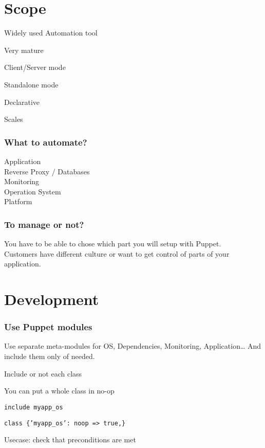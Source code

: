 \section{Scope}

\begin{iframe}[Puppet]
\item Widely used Automation tool\pause
\item Very mature\pause
\item Client/Server mode\pause
\item Standalone mode\pause
\item Declarative\pause
\item Scales
\end{iframe}

\begin{frame}
    \frametitle{What to automate?}
    \huge
    Application\\
    Reverse Proxy / Databases\\
    Monitoring\\
    Operation System\\
    Platform
\end{frame}

\begin{frame}
    \frametitle{To manage or not?}
    \huge You have to be able to chose which part you will setup with Puppet.\\\large Customers have different culture or want to get control of parts of your application.
\end{frame}

\section{Development}
\begin{frame}
    \frametitle{Use Puppet modules}
    \huge Use separate meta-modules for OS, Dependencies, Monitoring, Application\dots{} And include them only of needed.
\end{frame}

\begin{iframe}
\item Include or not each class
\item You can put a whole class in no-op
\item {\texttt{include myapp\_os}}
\item {\texttt{class \{'myapp\_os': noop => true,\}}}
\item {Usecase: check that preconditions are met}
\end{iframe}

